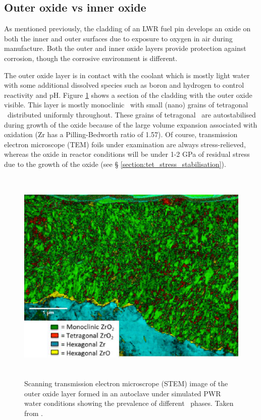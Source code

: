\subsection{Outer oxide vs inner oxide} \label{section:outervsinner}

As mentioned previously, the cladding of an LWR fuel pin develops an oxide on both the inner and outer surfaces due to exposure to oxygen in air during manufacture. Both the outer and inner oxide layers provide protection against corrosion, though the corrosive environment is different. 

The outer oxide layer is in contact with the coolant which is mostly light water with some additional dissolved species such as boron and hydrogen to control reactivity and pH. Figure \ref{figure:outer_oxide} shows a section of the cladding with the outer oxide visible. This layer is mostly monoclinic \zirconia\ with small (nano) grains of tetragonal \zirconia\ distributed uniformly throughout. These grains of tetragonal \zirconia\ are autostabilised during growth of the oxide because of the large volume expansion associated with oxidation (Zr has a Pilling-Bedworth ratio of 1.57). Of course, transmission electron microscope (TEM) foils under examination are always stress-relieved, whereas the oxide in reactor conditions will be under 1-2 GPa of residual stress due to the growth of the oxide (see § \ref{section:tet_stress_stabilisation}).

\begin{figure}[ht]
\centering
\includegraphics[height=10.5cm]{images/outer_oxide.png}
\caption[Scanning transmission electron microscrope (STEM) image of the outer oxide layer formed in an autoclave under simulated PWR water conditions showing the prevalence of different \zirconia\ phases.]{Scanning transmission electron microscrope (STEM) image of the outer oxide layer formed in an autoclave under simulated PWR water conditions showing the prevalence of different \zirconia\ phases. Taken from \cite{Hu2016}.}
\label{figure:outer_oxide}
\end{figure}

